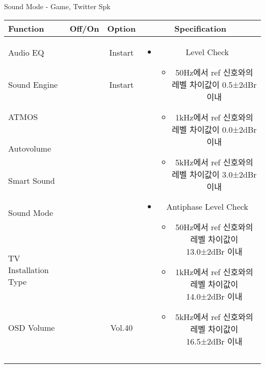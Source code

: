 \begin{frame}[t]{Sound Mode - Game, Twitter Spk}
\begin{tiny}
\begin{tabular}{@{}lccc@{}}
\toprule
Function & Off/On & Option & Specification \\
\midrule
Audio EQ & \color{black}{Off} & Instart &
\multirow{10}{60mm}{
\begin{itemize}
    \item Level Check
    \begin{itemize}
        \item 50Hz에서 ref 신호와의 레벨 차이값이 0.5±2dBr 이내
        \item 1kHz에서 ref 신호와의 레벨 차이값이 0.0±2dBr 이내
        \item 5kHz에서 ref 신호와의 레벨 차이값이 3.0±2dBr 이내
    \end{itemize}
    \item Antiphase Level Check
    \begin{itemize}
        \item 50Hz에서 ref 신호와의 레벨 차이값이 13.0±2dBr 이내
        \item 1kHz에서 ref 신호와의 레벨 차이값이 14.0±2dBr 이내
        \item 5kHz에서 ref 신호와의 레벨 차이값이 16.5±2dBr 이내
    \end{itemize}
\end{itemize}
} \\
Sound Engine & \color{blue}{On} & Instart & \\
ATMOS & \color{black}{Off}  & & \\
Autovolume & \color{black}{Off} & & \\
Smart Sound & \color{black}{Off} & & \\
Sound Mode & \color{blue}{On} & \color{blue}{Game} & \\
TV Installation Type & \color{blue}{On} & \color{black}{Standtype1} & \\
OSD Volume & \color{blue}{On} & Vol.40 & \\
& & & \\
& & & \\
& & & \\
& & & \\
\midrule
\end{tabular}
\end{tiny}

\end{frame}
